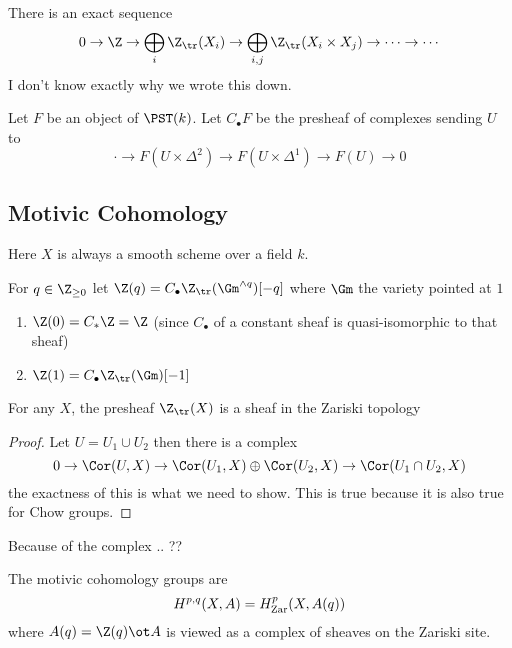 \documentclass[12pt]{article}
\begin{document}
There is an exact sequence
\[ 0 \to \Z \to \bigoplus_i \Z_{\tr}(X_i) \to \bigoplus_{i,j} \Z_{\tr}(X_i \times X_j) \to \cdots \to \cdots \]
I don't know exactly why we wrote this down.

\begin{defn}
Let $F$ be an object of $\PST(k)$. Let $C_\bullet F$ be the presheaf of complexes sending $U$ to
\[ \cdot \to F(U \times \Delta^2) \to F(U \times \Delta^1) \to F(U) \to 0 \]
\end{defn}

\subsection{Motivic Cohomology}

Here $X$ is always a smooth scheme over a field $k$.

\begin{defn}
For $q \in \Z_{\ge 0}$ let $\Z(q) = C_\bullet \Z_{\tr}(\Gm^{\wedge q})[-q]$ where $\Gm$ the variety pointed at $1$
\end{defn}

\begin{example}
\begin{enumerate}
\item $\Z(0) = C_* \Z = \Z$ (since $C_\bullet$ of a constant sheaf is quasi-isomorphic to that sheaf)
\item $\Z(1)=  C_\bullet \Z_{\tr}(\Gm)[-1]$ 
\end{enumerate}
\end{example}

\begin{prop}
For any $X$, the presheaf $\Z_{\tr}(X)$ is a sheaf in the Zariski topology 
\end{prop}

\begin{proof}
Let $U = U_1 \cup U_2$ then there is a complex
\[ 0 \to \Cor(U, X) \to \Cor(U_1, X) \oplus \Cor(U_2, X) \to \Cor(U_1 \cap U_2, X) \]
the exactness of this is what we need to show. This is true because it is also true for Chow groups. 
\end{proof}


Because of the complex .. ??

\begin{defn}
The motivic cohomology groups are
\[ H^{p,q}(X, A) = H^p_{\mathrm{Zar}}(X, A(q)) \]
where $A(q) = \Z(q) \ot A$ is viewed as a complex of sheaves on the Zariski site. 
\end{defn}
\end{document}
